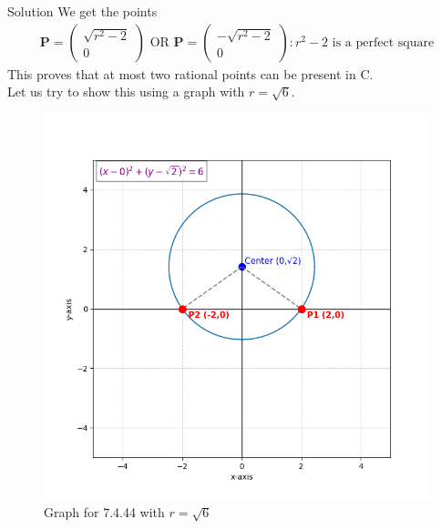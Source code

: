 \documentclass{beamer}
\let\vec\mathbf
\theoremstyle{remark}
\newcommand{\myvec}[1]{\ensuremath{\begin{pmatrix}#1\end{pmatrix}}}
\begin{document}
\begin{frame}{Solution}
We get the points 
\begin{align}
    \vec{P}=\myvec{\sqrt{r^2 - 2}\\0} \text{ OR } \vec{P} = \myvec{-\sqrt{r^2 - 2}\\0} : r^2 - 2 \text{ is a perfect square} 
\end{align}
This proves that at most two rational points can be present in C.\\
Let us try to show this using a graph with $r=\sqrt{6}$.
\begin{figure}[H]
    \centering
    \includegraphics[width=0.4\columnwidth]{figs/1.png}
    \caption{Graph for 7.4.44 with $r= \sqrt{6}$}
    \label{fig:placeholder}
\end{figure}
\end{frame}
\end{document}
